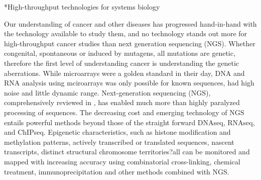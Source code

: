 \documentclass[12pt]{article}
\makeatletter
\renewcommand\subsection{\@startsection
	{subsection}{2}{0mm}
	{-0.05in}
	{-0.5\baselineskip}
	{\normalfont\normalsize\bfseries}}
\makeatother
\begin{document}
\subsection*{High-throughput technologies for systems biology} 

Our understanding of cancer and other diseases has progressed hand-in-hand with the technology available to study them, and no technology stands out more for high-throughput cancer studies than next generation sequencing (NGS). Whether congenital, spontaneous or induced by mutagens, all mutations are genetic, therefore the first level of understanding cancer is understanding the genetic aberrations. While microarrays were a golden standard in their day, DNA and RNA analysis using mciroarrays was only possible for known sequences, had high noise and little dynamic range. Next-generation sequencing (NGS), comprehensively reviewed in \cite{Soon2013}, has enabled much more than highly paralyzed processing of sequences. The decreasing cost and emerging technology of NGS entails powerful methods beyond those of the straight forward DNAseq, RNAseq, and ChIPseq. Epigenetic characteristics, such as histone modification and methylation patterns, actively transcribed or translated sequences, nascent transcripts, distinct structural chromosome territories?all can be monitored and mapped with increasing accuracy using combinatorial cross-linking, chemical treatment, immunoprecipitation and other methods combined with NGS.
	
\end{document}
